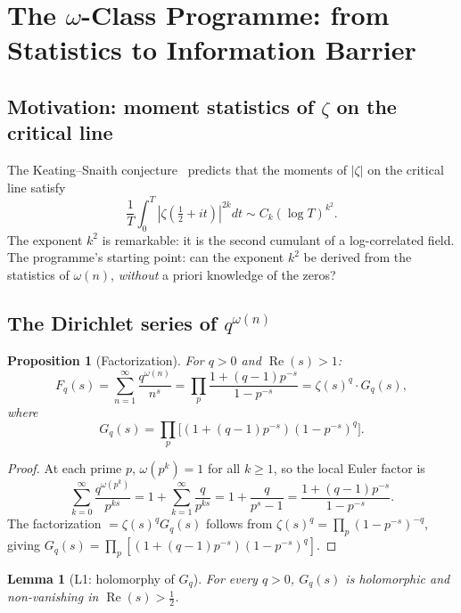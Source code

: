 \documentclass[11pt]{amsart}
\newtheorem{proposition}[theorem]{Proposition}
\newtheorem{lemma}[theorem]{Lemma}
\theoremstyle{definition}
\theoremstyle{remark}
\renewcommand{\Re}{\operatorname{Re}}
\newcommand{\half}{\tfrac{1}{2}}
\newcommand{\om}{\omega}
\begin{document}
\section{The $\omega$-Class Programme: from Statistics to Information Barrier}
\label{sec:omega-full}

\subsection{Motivation: moment statistics of $\zeta$ on the critical line}
\label{ss:omega-motivation}

The Keating--Snaith conjecture~\cite{KS00} predicts that the moments of $|\zeta|$ on
the critical line satisfy
\[
  \frac{1}{T}\int_0^T |\zeta(\half + it)|^{2k} dt \sim C_k (\log T)^{k^2}.
\]
The exponent $k^2$ is remarkable: it is the second cumulant of a log-correlated field.
The programme's starting point: can the exponent $k^2$ be derived from the statistics
of $\om(n)$, \emph{without} a priori knowledge of the zeros?

\subsection{The Dirichlet series of $q^{\omega(n)}$}
\label{ss:dirichlet}

\begin{proposition}[Factorization]
\label{prop:factorization}
For $q > 0$ and $\Re(s) > 1$:
\[
  F_q(s) = \sum_{n=1}^\infty \frac{q^{\om(n)}}{n^s}
  = \prod_p \frac{1+(q-1)p^{-s}}{1-p^{-s}}
  = \zeta(s)^q \cdot G_q(s),
\]
where
\[
  G_q(s) = \prod_p \bigl[(1+(q-1)p^{-s})(1-p^{-s})^q\bigr].
\]
\end{proposition}

\begin{proof}
At each prime $p$, $\om(p^k) = 1$ for all $k\ge 1$, so the local Euler factor is
\[
  \sum_{k=0}^\infty \frac{q^{\om(p^k)}}{p^{ks}}
  = 1 + \sum_{k=1}^\infty \frac{q}{p^{ks}}
  = 1 + \frac{q}{p^s-1}
  = \frac{1+(q-1)p^{-s}}{1-p^{-s}}.
\]
The factorization $= \zeta(s)^q G_q(s)$ follows from
$\zeta(s)^q = \prod_p (1-p^{-s})^{-q}$, giving
$G_q(s) = \prod_p [(1+(q-1)p^{-s})(1-p^{-s})^q]$.
\end{proof}

\begin{lemma}[L1: holomorphy of $G_q$]
\label{lem:Gq}
For every $q > 0$, $G_q(s)$ is holomorphic and non-vanishing in $\Re(s) > \half$.
\end{lemma}
\end{document}
